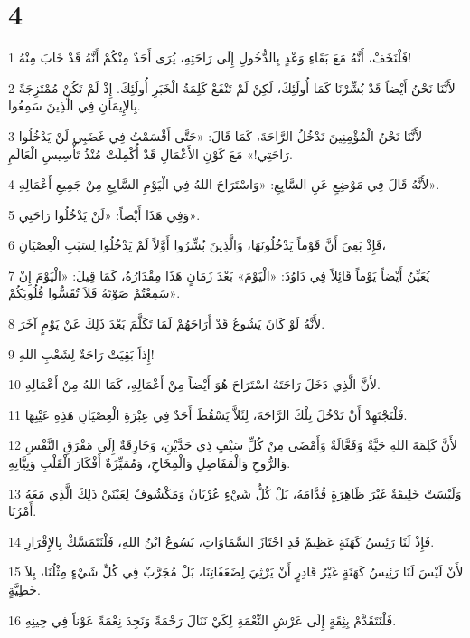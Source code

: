 \chapter{4}

\par 1 فَلْنَخَفْ، أَنَّهُ مَعَ بَقَاءِ وَعْدٍ بِالدُّخُولِ إِلَى رَاحَتِهِ، يُرَى أَحَدٌ مِنْكُمْ أَنَّهُ قَدْ خَابَ مِنْهُ!
\par 2 لأَنَّنَا نَحْنُ أَيْضاً قَدْ بُشِّرْنَا كَمَا أُولَئِكَ، لَكِنْ لَمْ تَنْفَعْ كَلِمَةُ الْخَبَرِ أُولَئِكَ. إِذْ لَمْ تَكُنْ مُمْتَزِجَةً بِالإِيمَانِ فِي الَّذِينَ سَمِعُوا.
\par 3 لأَنَّنَا نَحْنُ الْمُؤْمِنِينَ نَدْخُلُ الرَّاحَةَ، كَمَا قَالَ: «حَتَّى أَقْسَمْتُ فِي غَضَبِي لَنْ يَدْخُلُوا رَاحَتِي!» مَعَ كَوْنِ الأَعْمَالِ قَدْ أُكْمِلَتْ مُنْذُ تَأْسِيسِ الْعَالَمِ.
\par 4 لأَنَّهُ قَالَ فِي مَوْضِعٍ عَنِ السَّابِعِ: «وَاسْتَرَاحَ اللهُ فِي الْيَوْمِ السَّابِعِ مِنْ جَمِيعِ أَعْمَالِهِ».
\par 5 وَفِي هَذَا أَيْضاً: «لَنْ يَدْخُلُوا رَاحَتِي».
\par 6 فَإِذْ بَقِيَ أَنَّ قَوْماً يَدْخُلُونَهَا، وَالَّذِينَ بُشِّرُوا أَوَّلاً لَمْ يَدْخُلُوا لِسَبَبِ الْعِصْيَانِ،
\par 7 يُعَيِّنُ أَيْضاً يَوْماً قَائِلاً فِي دَاوُدَ: «الْيَوْمَ» بَعْدَ زَمَانٍ هَذَا مِقْدَارُهُ، كَمَا قِيلَ: «الْيَوْمَ إِنْ سَمِعْتُمْ صَوْتَهُ فَلاَ تُقَسُّوا قُلُوبَكُمْ».
\par 8 لأَنَّهُ لَوْ كَانَ يَشُوعُ قَدْ أَرَاحَهُمْ لَمَا تَكَلَّمَ بَعْدَ ذَلِكَ عَنْ يَوْمٍ آخَرَ.
\par 9 إِذاً بَقِيَتْ رَاحَةٌ لِشَعْبِ اللهِ!
\par 10 لأَنَّ الَّذِي دَخَلَ رَاحَتَهُ اسْتَرَاحَ هُوَ أَيْضاً مِنْ أَعْمَالِهِ، كَمَا اللهُ مِنْ أَعْمَالِهِ.
\par 11 فَلْنَجْتَهِدْ أَنْ نَدْخُلَ تِلْكَ الرَّاحَةَ، لِئَلاَّ يَسْقُطَ أَحَدٌ فِي عِبْرَةِ الْعِصْيَانِ هَذِهِ عَيْنِهَا.
\par 12 لأَنَّ كَلِمَةَ اللهِ حَيَّةٌ وَفَعَّالَةٌ وَأَمْضَى مِنْ كُلِّ سَيْفٍ ذِي حَدَّيْنِ، وَخَارِقَةٌ إِلَى مَفْرَقِ النَّفْسِ وَالرُّوحِ وَالْمَفَاصِلِ وَالْمِخَاخِ، وَمُمَيِّزَةٌ أَفْكَارَ الْقَلْبِ وَنِيَّاتِهِ.
\par 13 وَلَيْسَتْ خَلِيقَةٌ غَيْرَ ظَاهِرَةٍ قُدَّامَهُ، بَلْ كُلُّ شَيْءٍ عُرْيَانٌ وَمَكْشُوفٌ لِعَيْنَيْ ذَلِكَ الَّذِي مَعَهُ أَمْرُنَا.
\par 14 فَإِذْ لَنَا رَئِيسُ كَهَنَةٍ عَظِيمٌ قَدِ اجْتَازَ السَّمَاوَاتِ، يَسُوعُ ابْنُ اللهِ، فَلْنَتَمَسَّكْ بِالإِقْرَارِ.
\par 15 لأَنْ لَيْسَ لَنَا رَئِيسُ كَهَنَةٍ غَيْرُ قَادِرٍ أَنْ يَرْثِيَ لِضَعَفَاتِنَا، بَلْ مُجَرَّبٌ فِي كُلِّ شَيْءٍ مِثْلُنَا، بِلاَ خَطِيَّةٍ.
\par 16 فَلْنَتَقَدَّمْ بِثِقَةٍ إِلَى عَرْشِ النِّعْمَةِ لِكَيْ نَنَالَ رَحْمَةً وَنَجِدَ نِعْمَةً عَوْناً فِي حِينِهِ.


